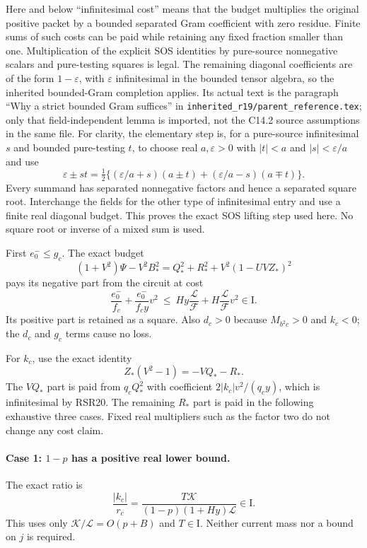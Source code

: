 Here and below ``infinitesimal cost'' means that the budget multiplies
the original positive packet by a bounded separated Gram coefficient
with zero residue. Finite sums of such costs can be paid while retaining
any fixed fraction smaller than one. Multiplication of the explicit
SOS identities by pure-source nonnegative scalars and pure-testing
squares is legal. The remaining diagonal coefficients are of the form
$1-\varepsilon$, with $\varepsilon$ infinitesimal in the bounded tensor
algebra, so the inherited bounded-Gram completion applies. Its actual
text is the paragraph ``Why a strict bounded Gram suffices'' in
\texttt{inherited\_r19/parent\_reference.tex}; only that field-independent
lemma is imported, not the C14.2 source assumptions in the same file.
For clarity, the elementary step is, for a pure-source infinitesimal
$s$ and bounded pure-testing $t$, to choose real $a,\varepsilon>0$
with $|t|<a$ and $|s|<\varepsilon/a$ and use
\[
 \varepsilon\pm st=\tfrac12\{(\varepsilon/a+s)(a\pm t)
                         +(\varepsilon/a-s)(a\mp t)\}.
\]
Every summand has separated nonnegative factors and hence a separated
square root. Interchange the fields for the other type of infinitesimal
entry and use a finite real diagonal budget. This proves the exact
SOS lifting step used here. No square root or inverse of a mixed sum
is used.

First $e_0^-\leq g_c$. The exact budget
\[
 (1+V^2)\Psi-V^2B_*^2
 =Q_*^2+R_*^2+V^2(1-UVZ_*)^2
 \tag{RSR23}
\]
pays its negative part from the circuit at cost
\[
 \frac{e_0^-}{f_c}+\frac{e_0^-}{f_cy}v^2
 \ \leq\ Hy\frac{\mathcal L}{\mathcal F}
       +H\frac{\mathcal L}{\mathcal F}v^2\in\mathrm I.
\]
Its positive part is retained as a square. Also $d_c>0$ because
$M_{b^2c}>0$ and $k_c<0$; the $d_c$ and $g_c$ terms cause no loss.

For $k_c$, use the exact identity
\[
 Z_*(V^2-1)=-VQ_*-R_*.
 \tag{RSR24}
\]
The $VQ_*$ part is paid from $q_cQ_*^2$ with coefficient
$2|k_c|v^2/(q_cy)$, which is infinitesimal by RSR20. The remaining
$R_*$ part is paid in the following exhaustive three cases. Fixed
real multipliers such as the factor two do not change any cost claim.

\paragraph{Case 1: $1-p$ has a positive real lower bound.}
The exact ratio is
\[
 \frac{|k_c|}{r_c}
 =\frac{T\mathcal K}{(1-p)(1+Hy)\mathcal L}\in\mathrm I.
 \tag{RSR25}
\]
This uses only $\mathcal K/\mathcal L=O(p+B)$ and $T\in\mathrm I$.
Neither current mass nor a bound on $j$ is required.

